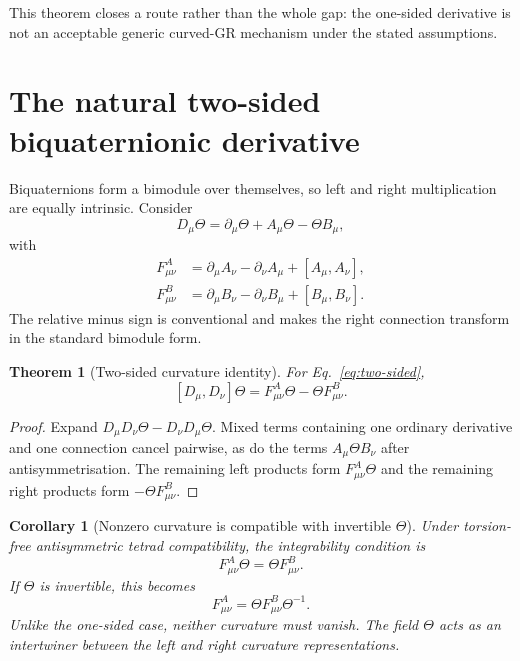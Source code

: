 \documentclass[12pt,a4paper]{article}
\newtheorem{theorem}[definition]{Theorem}
\newtheorem{corollary}[definition]{Corollary}
\theoremstyle{remark}\newtheorem{remark}[definition]{Remark}
\begin{document}
This theorem closes a route rather than the whole gap: the one-sided derivative
is not an acceptable generic curved-GR mechanism under the stated assumptions.

\section{The natural two-sided biquaternionic derivative}
Biquaternions form a bimodule over themselves, so left and right multiplication
are equally intrinsic.  Consider
\begin{equation}
 \boxed{
 D_\mu\Theta
 =\partial_\mu\Theta+A_\mu\Theta-\Theta B_\mu,}
 \label{eq:two-sided}
\end{equation}
with
\begin{align}
 F^A_{\mu\nu}
 &=\partial_\mu A_\nu-\partial_\nu A_\mu+[A_\mu,A_\nu],\\
 F^B_{\mu\nu}
 &=\partial_\mu B_\nu-\partial_\nu B_\mu+[B_\mu,B_\nu].
\end{align}
The relative minus sign is conventional and makes the right connection
transform in the standard bimodule form.

\begin{theorem}[Two-sided curvature identity]
\label{thm:two-sided-curvature}
For Eq.~\eqref{eq:two-sided},
\begin{equation}
 \boxed{
 [D_\mu,D_\nu]\Theta
 =F^A_{\mu\nu}\Theta-\Theta F^B_{\mu\nu}.}
 \label{eq:two-sided-curvature}
\end{equation}
\end{theorem}

\begin{proof}
Expand $D_\mu D_\nu\Theta-D_\nu D_\mu\Theta$.  Mixed terms containing one
ordinary derivative and one connection cancel pairwise, as do the terms
$A_\mu\Theta B_\nu$ after antisymmetrisation.  The remaining left products form
$F^A_{\mu\nu}\Theta$ and the remaining right products form
$-\Theta F^B_{\mu\nu}$.
\end{proof}

\begin{corollary}[Nonzero curvature is compatible with invertible $\Theta$]
Under torsion-free antisymmetric tetrad compatibility, the integrability
condition is
\begin{equation}
 F^A_{\mu\nu}\Theta=\Theta F^B_{\mu\nu}.
 \label{eq:curvature-intertwiner}
\end{equation}
If $\Theta$ is invertible, this becomes
\begin{equation}
 \boxed{F^A_{\mu\nu}=\Theta F^B_{\mu\nu}\Theta^{-1}.}
 \label{eq:curvature-conjugacy}
\end{equation}
Unlike the one-sided case, neither curvature must vanish.  The field $\Theta$
acts as an intertwiner between the left and right curvature representations.
\end{corollary}
\end{document}
